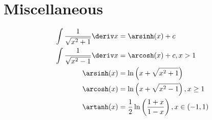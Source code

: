\documentclass[10pt, a4paper]{article}
\begin{document}
\section{Miscellaneous}
\begin{multicols}{2}
    
    \begin{align*}
        \int \frac{1}{\sqrt{x^2 + 1}} \deriv x &= \arsinh(x) + c \\
        \int \frac{1}{\sqrt{x^2 - 1}} \deriv x &= \arcosh(x) + c, x > 1 \\
        \arsinh(x) &= \ln \left(x + \sqrt{x^2 + 1}\right) \\
        \arcosh(x) &= \ln \left(x + \sqrt{x^2 - 1}\right), x \geq 1 \\
        \artanh(x) &= \frac{1}{2} \ln \left(\frac{1 + x}{1 - x}\right), x \in (-1, 1) \\
    \end{align*}


\end{multicols}
\end{document}
